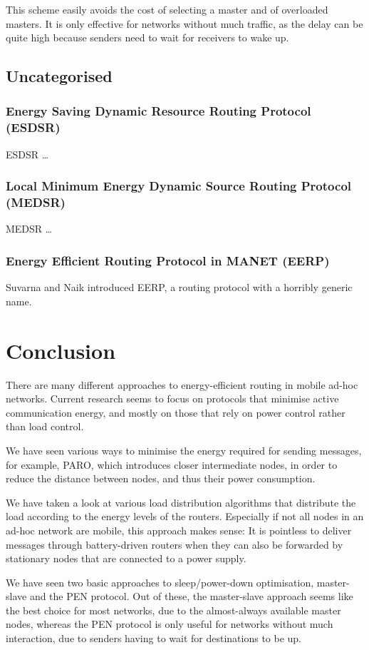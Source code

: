 \documentclass[conference]{IEEEtran}
\begin{document}
This scheme easily avoids the cost of selecting a master and of overloaded
masters. It is only effective for networks without much traffic, as the delay
can be quite high because senders need to wait for receivers to wake up.



\subsection{Uncategorised}

\subsubsection{Energy Saving Dynamic Resource Routing Protocol (ESDSR)}
ESDSR\cite{tarique2005energy} \ldots
\subsubsection{Local Minimum Energy Dynamic Source Routing Protocol (MEDSR)}
MEDSR\cite{tanque2007minimum} \ldots

\subsubsection{Energy Efficient Routing Protocol in MANET (EERP)}
Suvarna and Naik introduced EERP, a routing protocol with a horribly
generic name\cite{main2}.

\section{Conclusion}
There are many different approaches to energy-efficient routing in
mobile ad-hoc networks. Current research seems to focus on protocols
that minimise active communication energy, and mostly on those that
rely on power control rather than load control.

We have seen various ways to minimise the energy required for sending
messages, for example, PARO, which introduces closer intermediate nodes,
in order to reduce the distance between nodes, and thus their
power consumption.

We have taken a look at various load distribution algorithms that distribute
the load according to the energy levels of the routers. Especially if not all
nodes in an ad-hoc network are mobile, this approach makes sense: It is
pointless to deliver messages through battery-driven routers when they can
also be forwarded by stationary nodes that are connected to a power supply.

We have seen two basic approaches to sleep/power-down optimisation, master-slave
and the PEN protocol. Out of these, the master-slave approach seems like the
best choice for most networks, due to the almost-always available master nodes,
whereas the PEN protocol is only useful for networks without much interaction,
due to senders having to wait for destinations to be up.




\end{document}
